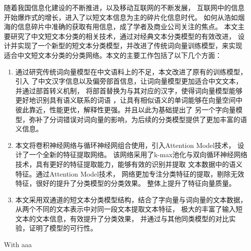 \begin{chineseabstract}
随着我国信息化建设的不断推进，以及移动互联网的不断发展，
互联网中的信息开始爆炸式的增长，进入了以短文本信息为主的碎片化信息时代。
如何从浩如烟海的信息碎片中准确的获取有用信息，成了学者及商业公司关注的焦点。
本文主要研究了中文短文本分类的相关技术，通过对经典文本分类模型的有效改进，
设计并实现了一个新型的短文本分类模型，并改进了传统词向量训练模型，来实现
适合中文短文本分类的分类网络。本文的主要工作包括了以下几个方面：
\begin{enumerate}
    \item 通过研究传统词向量模型在中文语料上的不足，本文改进了原有的训练模型，引入
    了中文汉字信息以及偏旁部首信息，让词向量模型更加适合中文文本，并通过部首转义机制，
    将部首替换为与其对应的汉字，使得词向量模型能够更好地识别具有语义联系的词语
    ，让具有相似语义的单词能够在向量空间中彼此靠近，性能更优，解释性更强。并且以此为基础提出了
    另一个字向量模型，弥补了分词错误对词向量的影响，为后续的分类模型提供了更加丰富的语义信息。
    \item 本文将卷积神经网络与循环神经网组合使用，引入Attention Model技术，
    设计了一个全新的特征提取网络。
    该网络采用了k-max池化与双向循环神经网络技术，具有更好的特征提取能力，能够有效的识别并提取
    文本数据中的语义特征。通过Attention Model技术，
    网络更加专注分类特征的提取，剔除无效特征，很好的提升了分类模型的分类效果。
    整体上提升了特征向量质量。
    \item 本文采用双通道的短文本分类模型结构，结合了字向量与词向量的文本数据，
    从两个不同的文本表示中对同一段文本提取文本特征，
    极大的丰富了输入短文本的文本信息，有效提升了分类效果，
    并通过与其他同类模型的对比实验，证明了模型的可行性。
\end{enumerate}


\end{chineseabstract}



\begin{englishabstract}
With aaa

\end{englishabstract}
    